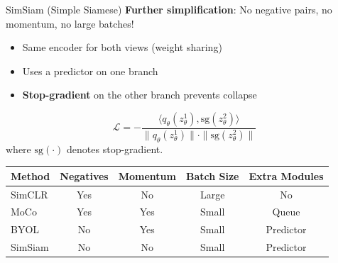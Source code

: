 \documentclass[11pt]{beamer}
\begin{document}
\begin{frame}{SimSiam (Simple Siamese)}
    \textbf{Further simplification}: No negative pairs, no momentum, no large batches!
    \vspace{0.5em}
    \begin{itemize}
        \item Same encoder for both views (weight sharing)
        \item Uses a predictor on one branch
        \item \textbf{Stop-gradient} on the other branch prevents collapse
    \end{itemize}
    \[
        \mathcal{L} = -\frac{\langle q_\theta(z_\theta^1), \text{sg}(z_\theta^2) \rangle}{\|q_\theta(z_\theta^1)\| \cdot \|\text{sg}(z_\theta^2)\|}
    \]
    where $\text{sg}(\cdot)$ denotes stop-gradient.
    \vfill
    \centering
    \begin{tabular}{lcccc}
        \toprule
        Method & Negatives & Momentum & Batch Size & Extra Modules \\
        \midrule
        SimCLR & Yes & No & Large & No \\
        MoCo & Yes & Yes & Small & Queue \\
        BYOL & No & Yes & Small & Predictor \\
        SimSiam & No & No & Small & Predictor \\
        \bottomrule
    \end{tabular}
\end{frame}
\end{document}

